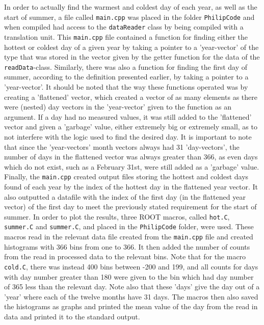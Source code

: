 \documentclass[a4, 12pt]{article}
\begin{document}
\indent In order to actually find the warmest and coldest day of each year, as well as the start of summer, a file called \texttt{main.cpp} was placed in the folder \texttt{PhilipCode} and when compiled had access to the \texttt{dataReader} class by being compiled with a translation unit. This \texttt{main.cpp} file contained a function for finding either the hottest or coldest day of a given year by taking a pointer to a 'year-vector' of the type that was stored in the vector given by the getter function for the data of the \texttt{readData}-class. Similarly, there was also a function for finding the first day of summer, according to the definition presented earlier, by taking a pointer to a 'year-vector'. It should be noted that the way these functions operated was by creating a 'flattened' vector, which created a vector of as many elements as there were (nested) day vectors in the 'year-vector' given to the function as an argument. If a day had no measured values, it was still added to the 'flattened' vector and given a 'garbage' value, either extremely big or extremely small, as to not interfere with the logic used to find the desired day. It is important to note that since the 'year-vectors' month vectors always had 31 'day-vectors', the number of days in the flattened vector was always greater than 366, as even days which do not exist, such as a February 31st, were still added as a 'garbage' value. Finally, the \texttt{main.cpp} created output files storing the hottest and coldest days found of each year by the index of the hottest day in the flattened year vector. It also outputted a datafile with the index of the first day (in the flattened year vector) of the first day to meet the previously stated requirement for the start of summer. \newline \indent
In order to plot the results, three ROOT macros, called \texttt{hot.C}, \texttt{summer.C} and \texttt{summer.C}, and placed in the \texttt{PhilipCode} folder, were used. These macros read in the relevant data file created from the \texttt{main.cpp} file and created histograms with 366 bins from one to 366. It then added the number of counts from the read in processed data to the relevant bins. Note that for the macro \texttt{cold.C}, there was instead 400 bins between -200 and 199, and all counts for days with day number greater than 180 were given to the bin which had day number of 365 less than the relevant day. Note also that these 'days' give the day out of a 'year' where each of the twelve months have 31 days. The macros then also saved the histograms as graphs and printed the mean value of the day from the read in data and printed it to the standard output.
\end{document}
